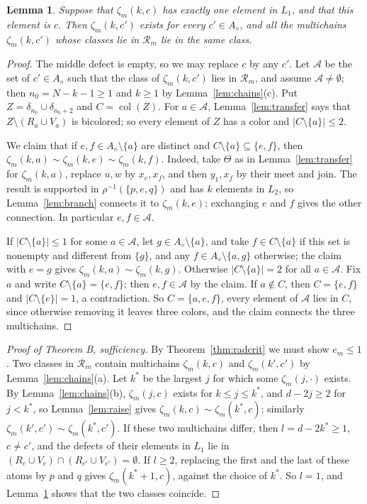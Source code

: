 \documentclass{amsart}
\newtheorem{lemma}[theorem]{Lemma}
\theoremstyle{definition}
\DeclareMathOperator{\col}{col}
\newcommand{\dm}{\diamond}
\begin{document}
\begin{lemma}\label{lem:top}
Suppose that $\zeta_m(k,c)$ has exactly one element in $L_1$, and that this element is $c$. Then $\zeta_m(k,c')$ exists for every $c'\in A_\dm$, and all the multichains $\zeta_m(k,c')$ whose classes lie in $\mathcal R_m$ lie in the same class.
\end{lemma}

\begin{proof}
The middle defect is empty, so we may replace $c$ by any $c'$. Let $\mathcal A$ be the set of $c'\in A_\dm$ such that the class of $\zeta_m(k,c')$ lies in $\mathcal R_m$, and assume $\mathcal A\ne\emptyset$; then $n_0=N-k-1\ge1$ and $k\ge1$ by Lemma~\ref{lem:chains}(c). Put $Z=\delta_{n_0}\cup\delta_{n_0+2}$ and $C=\col(Z)$. For $a\in\mathcal A$, Lemma~\ref{lem:transfer} says that $Z\setminus(R_a\cup V_a)$ is bicolored; so every element of $Z$ has a color and $|C\setminus\{a\}|\le2$.

We claim that if $e,f\in A_\dm\setminus\{a\}$ are distinct and $C\setminus\{a\}\subseteq\{e,f\}$, then $\zeta_m(k,a)\sim\zeta_m(k,e)\sim\zeta_m(k,f)$. Indeed, take $\Theta$ as in Lemma~\ref{lem:transfer} for $\zeta_m(k,a)$, replace $u,w$ by $x_e,x_f$, and then $y_1,x_f$ by their meet and join. The result is supported in $\rho^{-1}(\{p,e,q\})$ and has $k$ elements in $L_2$, so Lemma~\ref{lem:branch} connects it to $\zeta_m(k,e)$; exchanging $e$ and $f$ gives the other connection. In particular $e,f\in\mathcal A$.

If $|C\setminus\{a\}|\le1$ for some $a\in\mathcal A$, let $g\in A_\dm\setminus\{a\}$, and take $f\in C\setminus\{a\}$ if this set is nonempty and different from $\{g\}$, and any $f\in A_\dm\setminus\{a,g\}$ otherwise; the claim with $e=g$ gives $\zeta_m(k,a)\sim\zeta_m(k,g)$. Otherwise $|C\setminus\{a\}|=2$ for all $a\in\mathcal A$. Fix $a$ and write $C\setminus\{a\}=\{e,f\}$; then $e,f\in\mathcal A$ by the claim. If $a\notin C$, then $C=\{e,f\}$ and $|C\setminus\{e\}|=1$, a contradiction. So $C=\{a,e,f\}$, every element of $\mathcal A$ lies in $C$, since otherwise removing it leaves three colors, and the claim connects the three multichains.
\end{proof}

\begin{proof}[Proof of Theorem B, sufficiency]
By Theorem~\ref{thm:radcrit} we must show $e_m\le1$. Two classes in $\mathcal R_m$ contain multichains $\zeta_m(k,c)$ and $\zeta_m(k',c')$ by Lemma~\ref{lem:chains}(a). Let $k^*$ be the largest $j$ for which some $\zeta_m(j,\cdot)$ exists. By Lemma~\ref{lem:chains}(b), $\zeta_m(j,c)$ exists for $k\le j\le k^*$, and $d-2j\ge2$ for $j<k^*$, so Lemma~\ref{lem:raise} gives $\zeta_m(k,c)\sim\zeta_m(k^*,c)$; similarly $\zeta_m(k',c')\sim\zeta_m(k^*,c')$. If these two multichains differ, then $l=d-2k^*\ge1$, $c\ne c'$, and the defects of their elements in $L_1$ lie in $(R_c\cup V_c)\cap(R_{c'}\cup V_{c'})=\emptyset$. If $l\ge2$, replacing the first and the last of these atoms by $p$ and $q$ gives $\zeta_m(k^*+1,c)$, against the choice of $k^*$. So $l=1$, and Lemma~\ref{lem:top} shows that the two classes coincide.
\end{proof}
\end{document}
